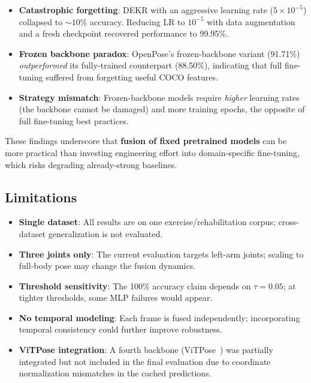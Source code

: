\documentclass[11pt,a4paper]{article}
\begin{document}
\begin{itemize}[nosep]
    \item \textbf{Catastrophic forgetting}: DEKR with an aggressive learning
        rate ($5{\times}10^{-5}$) collapsed to ${\sim}10\%$ accuracy.  Reducing
        LR to $10^{-5}$ with data augmentation and a fresh checkpoint
        recovered performance to 99.95\%.
    \item \textbf{Frozen backbone paradox}: OpenPose's frozen-backbone
        variant (91.71\%) \emph{outperformed} its fully-trained counterpart
        (88.50\%), indicating that full fine-tuning suffered from forgetting
        useful COCO features.
    \item \textbf{Strategy mismatch}: Frozen-backbone models require
        \emph{higher} learning rates (the backbone cannot be damaged) and more
        training epochs, the opposite of full fine-tuning best practices.
\end{itemize}

These findings underscore that \textbf{fusion of fixed pretrained models}
can be more practical than investing engineering effort into domain-specific
fine-tuning, which risks degrading already-strong baselines.

\subsection{Limitations}

\begin{itemize}[nosep]
    \item \textbf{Single dataset}: All results are on one exercise/rehabilitation
        corpus; cross-dataset generalization is not evaluated.
    \item \textbf{Three joints only}: The current evaluation targets left-arm
        joints; scaling to full-body pose may change the fusion dynamics.
    \item \textbf{Threshold sensitivity}: The 100\% accuracy claim depends on
        $\tau{=}0.05$; at tighter thresholds, some MLP failures would appear.
    \item \textbf{No temporal modeling}: Each frame is fused independently;
        incorporating temporal consistency could further improve robustness.
    \item \textbf{ViTPose integration}: A fourth backbone (ViTPose~\cite{xu2022vitpose})
        was partially integrated but not included in the final evaluation due
        to coordinate normalization mismatches in the cached predictions.
\end{itemize}
\end{document}
